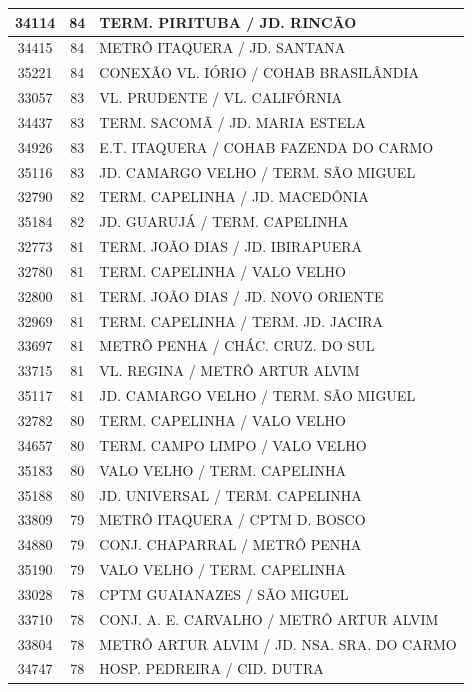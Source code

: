 \documentclass[
	12pt,				%
	oneside,			%
	a4paper,			%
	english,			%
	brazil				%
	]{abntex2ppgsi}
\begin{document}
{{{\begin{apendicesenv}
\begin{longtable}{c|c|p{7cm}}
 \hline 
34114 &	84 &	TERM. PIRITUBA / JD. RINCÃO \\ 
 \hline 
34415 &	84 &	METRÔ ITAQUERA / JD. SANTANA \\ 
 \hline 
35221 &	84 &	CONEXÃO VL. IÓRIO / COHAB BRASILÂNDIA \\ 
 \hline 
33057 &	83 &	VL. PRUDENTE / VL. CALIFÓRNIA \\ 
 \hline 
34437 &	83 &	TERM. SACOMÃ / JD. MARIA ESTELA \\ 
 \hline 
34926 &	83 &	E.T. ITAQUERA / COHAB FAZENDA DO CARMO \\ 
 \hline 
35116 &	83 &	JD. CAMARGO VELHO / TERM. SÃO MIGUEL \\ 
 \hline 
32790 &	82 &	TERM. CAPELINHA / JD. MACEDÔNIA \\ 
 \hline 
35184 &	82 &	JD. GUARUJÁ / TERM. CAPELINHA \\ 
 \hline 
32773 &	81 &	TERM. JOÃO DIAS / JD. IBIRAPUERA \\ 
 \hline 
32780 &	81 &	TERM. CAPELINHA / VALO VELHO \\ 
 \hline 
32800 &	81 &	TERM. JOÃO DIAS / JD. NOVO ORIENTE \\ 
 \hline 
32969 &	81 &	TERM. CAPELINHA / TERM. JD. JACIRA \\ 
 \hline 
33697 &	81 &	METRÔ PENHA / CHÁC. CRUZ. DO SUL \\ 
 \hline 
33715 &	81 &	VL. REGINA / METRÔ ARTUR ALVIM \\ 
 \hline 
35117 &	81 &	JD. CAMARGO VELHO / TERM. SÃO MIGUEL \\ 
 \hline 
32782 &	80 &	TERM. CAPELINHA / VALO VELHO \\ 
 \hline 
34657 &	80 &	TERM. CAMPO LIMPO / VALO VELHO \\ 
 \hline 
35183 &	80 &	VALO VELHO / TERM. CAPELINHA \\ 
 \hline 
35188 &	80 &	JD. UNIVERSAL / TERM. CAPELINHA \\ 
 \hline 
33809 &	79 &	METRÔ ITAQUERA / CPTM D. BOSCO \\ 
 \hline 
34880 &	79 &	CONJ. CHAPARRAL / METRÔ PENHA \\ 
 \hline 
35190 &	79 &	VALO VELHO / TERM. CAPELINHA \\ 
 \hline 
33028 &	78 &	CPTM GUAIANAZES / SÃO MIGUEL \\ 
 \hline 
33710 &	78 &	CONJ. A. E. CARVALHO / METRÔ ARTUR ALVIM \\ 
 \hline 
33804 &	78 &	METRÔ ARTUR ALVIM / JD. NSA. SRA. DO CARMO \\ 
 \hline 
34747 &	78 &	HOSP. PEDREIRA / CID. DUTRA \\ 

\end{longtable}
\end{apendicesenv}}}}
\end{document}
